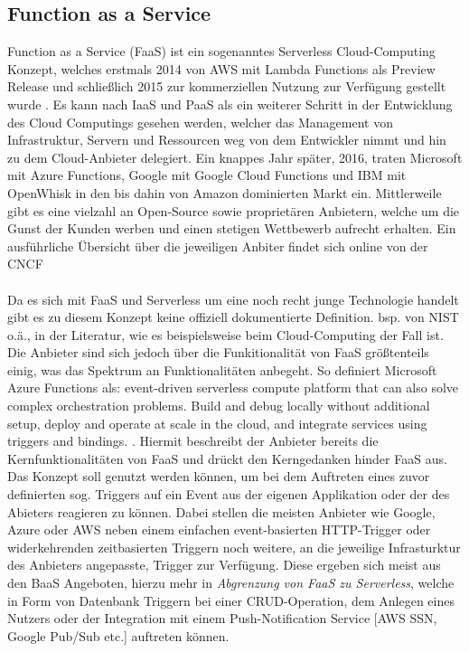 \documentclass[11pt]{article}
\begin{document}
\subsection{Function as a Service}
Function as a Service (FaaS) ist ein sogenanntes \glqq Serverless\grqq{} Cloud-Computing Konzept, welches erstmals 2014 von AWS mit Lambda Functions als Preview Release und schließlich 2015 zur kommerziellen Nutzung zur Verfügung gestellt wurde \cite{aws2020LambdaFunctions}. Es kann nach IaaS und PaaS als ein weiterer Schritt in der Entwicklung des Cloud Computings gesehen werden, welcher das Management von Infrastruktur, Servern und Ressourcen weg von dem Entwickler nimmt und hin zu dem Cloud-Anbieter delegiert. Ein knappes Jahr später, 2016, traten Microsoft mit Azure Functions, Google mit Google Cloud Functions und IBM mit OpenWhisk in den bis dahin von Amazon dominierten Markt ein. Mittlerweile gibt es eine vielzahl an Open-Source sowie proprietären Anbietern, welche um die Gunst der Kunden werben und einen stetigen Wettbewerb aufrecht erhalten. Ein ausführliche Übersicht über die jeweiligen Anbiter findet sich online von der CNCF \cite{cncf2020ServerlessLandscape}\\\\
Da es sich mit FaaS und Serverless um eine noch recht junge Technologie handelt gibt es zu diesem Konzept keine offiziell dokumentierte Definition. bsp. von NIST o.ä., in der Literatur, wie es beispielsweise beim Cloud-Computing \cite{mell2011nist} der Fall ist. Die Anbieter sind sich jedoch über die Funkitionalität von FaaS größtenteils einig, was das Spektrum an Funktionalitäten anbegeht. So definiert Microsoft Azure Functions als: \glqq [...] event-driven serverless compute platform that can also solve complex orchestration problems. Build and debug locally without additional setup, deploy and operate at scale in the cloud, and integrate services using triggers and bindings. \grqq{} \cite{azure2020Functions}. Hiermit beschreibt der Anbieter bereits die Kernfunktionalitäten von FaaS und drückt den Kerngedanken hinder FaaS aus. Das Konzept soll genutzt werden können, um bei dem Auftreten eines zuvor definierten sog. Triggers auf ein Event aus der eigenen Applikation oder der des Abieters reagieren zu können. Dabei stellen die meisten Anbieter wie Google, Azure oder AWS neben einem einfachen event-basierten HTTP-Trigger oder widerkehrenden zeitbasierten Triggern noch weitere, an die jeweilige Infrasturktur des Anbieters angepasste, Trigger zur Verfügung. Diese ergeben sich meist aus den BaaS Angeboten, hierzu mehr in \textit{Abgrenzung von FaaS zu Serverless}, welche in Form von Datenbank Triggern bei einer CRUD-Operation, dem Anlegen eines Nutzers oder der Integration mit einem Push-Notification Service [AWS SSN, Google Pub/Sub etc.] auftreten können.\\
\end{document}
